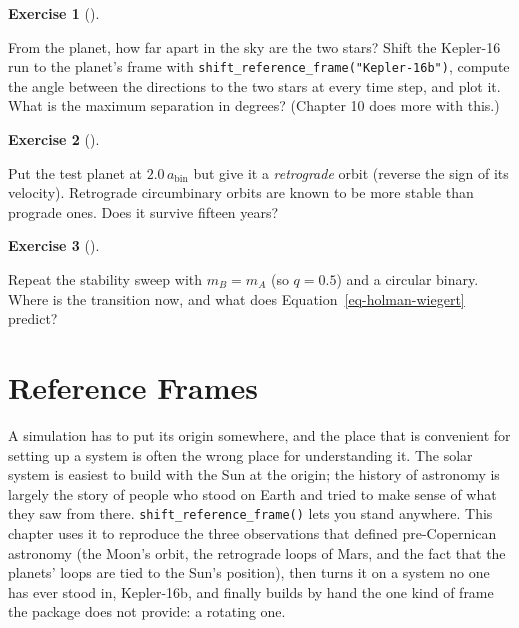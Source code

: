 \documentclass[
  10.5pt,
  letterpaper,
]{scrbook}
\theoremstyle{definition}
\newtheorem{exercise}{Exercise}[chapter]
\theoremstyle{plain}
\theoremstyle{remark}
\begin{document}
\begin{exercise}[]\protect\hypertarget{exr-ch9-sunset}{}\label{exr-ch9-sunset}

From the planet, how far apart in the sky are the two stars? Shift the
Kepler-16 run to the planet's frame with
\texttt{shift\_reference\_frame("Kepler-16b")}, compute the angle
between the directions to the two stars at every time step, and plot it.
What is the maximum separation in degrees? (Chapter 10 does more with
this.)

\end{exercise}

\begin{exercise}[]\protect\hypertarget{exr-ch9-retrograde}{}\label{exr-ch9-retrograde}

Put the test planet at \(2.0\,a_{\mathrm{bin}}\) but give it a
\emph{retrograde} orbit (reverse the sign of its velocity). Retrograde
circumbinary orbits are known to be more stable than prograde ones. Does
it survive fifteen years?

\end{exercise}

\begin{exercise}[]\protect\hypertarget{exr-ch9-mass-ratio}{}\label{exr-ch9-mass-ratio}

Repeat the stability sweep with \(m_B = m_A\) (so \(q = 0.5\)) and a
circular binary. Where is the transition now, and what does
Equation~\ref{eq-holman-wiegert} predict?

\end{exercise}

\chapter{Reference Frames}\label{sec-reference-frames}

A simulation has to put its origin somewhere, and the place that is
convenient for setting up a system is often the wrong place for
understanding it. The solar system is easiest to build with the Sun at
the origin; the history of astronomy is largely the story of people who
stood on Earth and tried to make sense of what they saw from there.
\texttt{shift\_reference\_frame()} lets you stand anywhere. This chapter
uses it to reproduce the three observations that defined pre-Copernican
astronomy (the Moon's orbit, the retrograde loops of Mars, and the fact
that the planets' loops are tied to the Sun's position), then turns it
on a system no one has ever stood in, Kepler-16b, and finally builds by
hand the one kind of frame the package does not provide: a rotating one.
\end{document}
